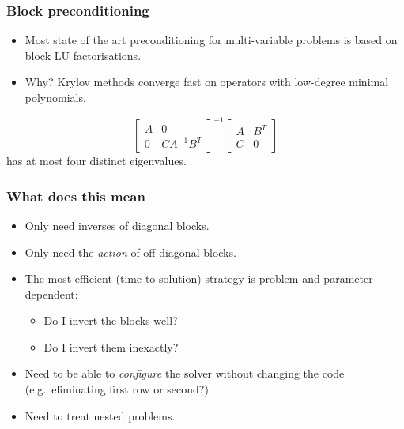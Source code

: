 \documentclass[presentation]{beamer}
\begin{document}
\begin{frame}
  \frametitle{Block preconditioning}
  \begin{itemize}
  \item Most state of the art preconditioning for multi-variable
    problems is based on block LU factorisations.
  \item Why? Krylov methods converge fast on operators with low-degree
    minimal polynomials.
  \end{itemize}

  \begin{block}{\cite{Murphy:2000}}
    \begin{equation*}
    \begin{bmatrix}
      A & 0 \\
      0 & C A^{-1} B^T
    \end{bmatrix}^{-1}
    \begin{bmatrix}
      A & B^T \\
      C & 0
    \end{bmatrix}
  \end{equation*}
    has at most four distinct eigenvalues.
  \end{block}
\end{frame}

\begin{frame}
  \frametitle{What does this mean}
  \begin{itemize}
  \item Only need inverses of diagonal blocks.
  \item Only need the \emph{action} of off-diagonal blocks.
  \item The most efficient (time to solution) strategy is problem and
    parameter dependent:
    \begin{itemize}
    \item Do I invert the blocks well?
    \item Do I invert them inexactly?
    \end{itemize}
  \item Need to be able to \emph{configure} the solver without
    changing the code (e.g.~eliminating first row or second?)
  \item Need to treat nested problems.
  \end{itemize}
\end{frame}
\end{document}

